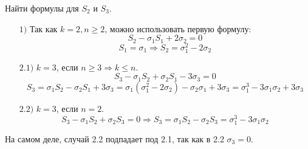 \documentclass[12pt]{article}
\begin{document}
\begin{examp}
Найти формулы для $S_2$ и $S_3$.
\begin{itemize}
\item[$1)$]
Так как $k = 2, n \geq 2$, можно использовать первую формулу:
$$S_2 - \sigma_1S_1 + 2\sigma_2 = 0$$
$$S_1 = \sigma_1 \Rightarrow S_2 = \sigma_1^2 - 2\sigma_2$$
\item[$2.1)$]
$k = 3$, если $n \geq 3 \Rightarrow k \leq n$.
$$S_3 - \sigma_1S_2 + \sigma_2S_1 - 3\sigma_3 = 0$$
$$S_3 = \sigma_1S_2 - \sigma_2S_1 + 3\sigma_3 = \sigma_1(\sigma_1^2 - 2\sigma_2) - \sigma_2\sigma_1 + 3\sigma_3 = 
\sigma_1^3 - 3\sigma_1\sigma_2 + 3\sigma_3$$
\item[$2.2)$]
$k = 3$, если $n = 2$.
$$S_3 - \sigma_1S_2 + \sigma_2S_3 = 0 \Rightarrow S_3 = \sigma_1S_2 - \sigma_2S_3 = \sigma_1^3  - 3\sigma_1\sigma_2$$
\end{itemize}
\indent На самом деле, случай 2.2 подпадает под 2.1, так как в 2.2 $\sigma_3 = 0$.
\end{examp}
\end{document}
